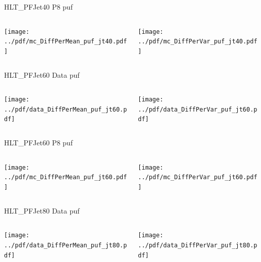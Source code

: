 \documentclass[9pt]{beamer}
\begin{document}
\begin{frame}[t]{HLT\_PFJet40 P8 puf}
\begin{columns}[T]
  \begin{column}{.5\textwidth}
  \texttt{[image: ../pdf/mc\_DiffPerMean\_puf\_jt40.pdf]}
  \end{column}
  \begin{column}{.5\textwidth}
  \texttt{[image: ../pdf/mc\_DiffPerVar\_puf\_jt40.pdf]}
  \end{column}
\end{columns}
\end{frame}

\begin{frame}[t]{HLT\_PFJet60 Data puf}
\begin{columns}[T]
  \begin{column}{.5\textwidth}
  \texttt{[image: ../pdf/data\_DiffPerMean\_puf\_jt60.pdf]}
  \end{column}
  \begin{column}{.5\textwidth}
  \texttt{[image: ../pdf/data\_DiffPerVar\_puf\_jt60.pdf]}
  \end{column}
\end{columns}
\end{frame}

\begin{frame}[t]{HLT\_PFJet60 P8 puf}
\begin{columns}[T]
  \begin{column}{.5\textwidth}
  \texttt{[image: ../pdf/mc\_DiffPerMean\_puf\_jt60.pdf]}
  \end{column}
  \begin{column}{.5\textwidth}
  \texttt{[image: ../pdf/mc\_DiffPerVar\_puf\_jt60.pdf]}
  \end{column}
\end{columns}
\end{frame}

\begin{frame}[t]{HLT\_PFJet80 Data puf}
\begin{columns}[T]
  \begin{column}{.5\textwidth}
  \texttt{[image: ../pdf/data\_DiffPerMean\_puf\_jt80.pdf]}
  \end{column}
  \begin{column}{.5\textwidth}
  \texttt{[image: ../pdf/data\_DiffPerVar\_puf\_jt80.pdf]}
  \end{column}
\end{columns}
\end{frame}
\end{document}
